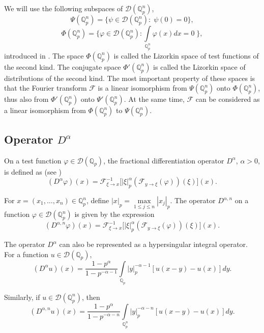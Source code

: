 \documentclass[14pt]{article}
\theoremstyle{theorem}
\theoremstyle{theorem}
\theoremstyle{definition}
\theoremstyle{lemma}
\newcommand{\Label}[1]{\label{#1}}
\numberwithin{equation}{section}
\begin{document}
We will use the following subspaces of $\mathcal{D}(\mathbb{Q}_p^n)$,
$$\Psi(\mathbb{Q}_p^n)=\{\psi\in\mathcal{D}(\mathbb{Q}_p^n):\;\psi(0)=0\},$$
$$\Phi(\mathbb{Q}_p^n)=\bigg\{\varphi\in\mathcal{D}(\mathbb{Q}_p^n):\int\limits_{\mathbb{Q}_p^n}\varphi(x)dx=0\;\bigg\},$$
introduced in \cite{A}. The space $\Phi(\mathbb{Q}_p^n)$ is called the Lizorkin space of test functions of the second kind. The conjugate space $\Phi'(\mathbb{Q}_p^n)$ is called the Lizorkin space of distributions of the second kind. The most important property of these spaces is that the Fourier transform $\mathcal{F}$ is a linear isomorphism from $\Psi(\mathbb{Q}_p^n)$ onto $\Phi(\mathbb{Q}_p^n)$, thus also from $\Phi'(\mathbb{Q}_p^n)$ onto $\Psi'(\mathbb{Q}_p^n)$. At the same time, $\mathcal{F}$ can be considered as a linear isomorphism from $\Phi(\mathbb{Q}_p^n)$ to $\Psi(\mathbb{Q}_p^n)$.

\subsection{Operator $D^{\alpha}$}

On a test function $\varphi\in\mathcal{D}(\mathbb{Q}_p)$, the fractional differentiation operator $D^{\alpha}$, $\alpha>0$, is defined as (see \cite{VVZ})
\begin{equation}\Label{1-6}
(D^{\alpha}\varphi)(x)=\mathcal{F}_{\xi\to x}^{-1}\big[|\xi|_p^{\alpha}(\mathcal{F}_{y\to\xi}(\varphi))(\xi)\big](x).
\end{equation}

For $x=(x_1,\dots,x_n)\in\mathbb{Q}_p^n$, define $|x|_p=\max\limits_{1\leq j\leq n}|x_j|_p$. The operator $D^{\alpha,n}$ on a function $\varphi\in\mathcal{D}(\mathbb{Q}_p^n)$ is given by the expression
$$(D^{\alpha,n}\varphi)(x)=\mathcal{F}_{\xi\to x}^{-1}\big[|\xi|_p^{\alpha}(\mathcal{F}_{y\to\xi}(\varphi))(\xi)\big](x).$$

The operator $D^{\alpha}$ can also be represented as a hypersingular integral operator. For a function $u\in\mathcal{D}(\mathbb{Q}_p)$,
\begin{equation}\Label{1-7}
(D^{\alpha}u)(x)=\frac{1-p^{\alpha}}{1-p^{-\alpha-1}}\int\limits_{\mathbb{Q}_p}|y|_p^{-\alpha-1}\left[u(x-y)-u(x)\right]dy.
\end{equation}

Similarly, if $u\in\mathcal{D}(\mathbb{Q}_p^n)$, then
$$(D^{\alpha,n}u)(x)=\frac{1-p^{\alpha}}{1-p^{-\alpha-n}}\int\limits_{\mathbb{Q}_p^n}|y|_p^{-\alpha-n}\left[u(x-y)-u(x)\right]dy.$$
\end{document}
